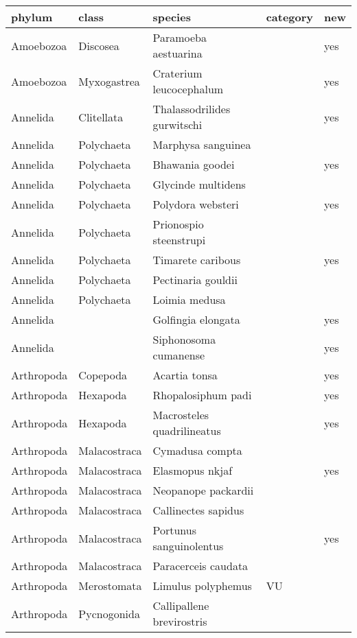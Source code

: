 \begingroup\fontsize{9pt}{10pt}\selectfont
\begin{longtable}{lllll}
  \hline
phylum & class & species & category & new \\ 
  \hline
Amoebozoa & Discosea & Paramoeba aestuarina &  & yes \\ 
  Amoebozoa & Myxogastrea & Craterium leucocephalum &  & yes \\ 
  Annelida & Clitellata & Thalassodrilides gurwitschi &  & yes \\ 
  Annelida & Polychaeta & Marphysa sanguinea &  &  \\ 
  Annelida & Polychaeta & Bhawania goodei &  & yes \\ 
  Annelida & Polychaeta & Glycinde multidens &  &  \\ 
  Annelida & Polychaeta & Polydora websteri &  & yes \\ 
  Annelida & Polychaeta & Prionospio steenstrupi &  &  \\ 
  Annelida & Polychaeta & Timarete caribous &  & yes \\ 
  Annelida & Polychaeta & Pectinaria gouldii &  &  \\ 
  Annelida & Polychaeta & Loimia medusa &  &  \\ 
  Annelida &  & Golfingia elongata &  & yes \\ 
  Annelida &  & Siphonosoma cumanense &  & yes \\ 
  Arthropoda & Copepoda & Acartia tonsa &  & yes \\ 
  Arthropoda & Hexapoda & Rhopalosiphum padi &  & yes \\ 
  Arthropoda & Hexapoda & Macrosteles quadrilineatus &  & yes \\ 
  Arthropoda & Malacostraca & Cymadusa compta &  &  \\ 
  Arthropoda & Malacostraca & Elasmopus nkjaf &  & yes \\ 
  Arthropoda & Malacostraca & Neopanope packardii &  &  \\ 
  Arthropoda & Malacostraca & Callinectes sapidus &  &  \\ 
  Arthropoda & Malacostraca & Portunus sanguinolentus &  & yes \\ 
  Arthropoda & Malacostraca & Paracerceis caudata &  &  \\ 
  Arthropoda & Merostomata & Limulus polyphemus & VU &  \\ 
  Arthropoda & Pycnogonida & Callipallene brevirostris &  &  \\ 

\end{longtable}
